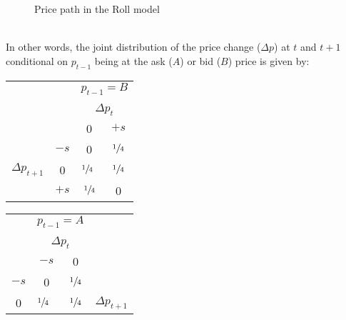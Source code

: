 \documentclass[12pt,twoside]{article}
\begin{document}
\begin{solution}
\begin{figure}[!htbp]
        \caption{Price path in the Roll model}
        \label{fig:roll_model}
    \end{figure}
    \\
    In other words, the joint distribution of the price change (\(\Delta p\)) at \(t\) and \(t+1\) conditional on \(p_{t-1}\) being at the ask (\(A\)) or bid (\(B\)) price is given by:
    \begin{table}[H]
        \centering
        \begingroup
        \color{nu purple}
        \begin{tabular}{cccc}
            & & \multicolumn{2}{c}{\(p_{t-1} = B\)} \\\\
            & & \multicolumn{2}{c}{\(\Delta p_{t}\)} \\
            & & 0 & \(+s\) \\ \cline{3-4} 
            & \multicolumn{1}{c|}{\(-s\)} & \multicolumn{1}{c|}{0}   & \multicolumn{1}{c|}{\(\sfrac{1}{4}\)} \\ \cline{3-4} 
    $\Delta p_{t+1}$ & \multicolumn{1}{c|}{0}  & \multicolumn{1}{l|}{\(\sfrac{1}{4}\)} & \multicolumn{1}{c|}{\(\sfrac{1}{4}\)} \\ \cline{3-4} 
            & \multicolumn{1}{c|}{\(+s\)} & \multicolumn{1}{c|}{\(\sfrac{1}{4}\)} & \multicolumn{1}{c|}{0}   \\ \cline{3-4} 
        \end{tabular}
        \qquad
        \begin{tabular}{cccc}
             & \multicolumn{2}{c}{\(p_{t-1} = A\)} & \\\\
             & \multicolumn{2}{c}{\(\Delta p_{t}\)} & \\
             & \(-s\) & 0 & \\ \cline{2-3} 
             \multicolumn{1}{c|}{\(-s\)} & \multicolumn{1}{c|}{0}   & \multicolumn{1}{c|}{\(\sfrac{1}{4}\)} & \\ \cline{2-3} 
      \multicolumn{1}{c|}{0}  & \multicolumn{1}{l|}{\(\sfrac{1}{4}\)} & \multicolumn{1}{c|}{\(\sfrac{1}{4}\)} & $\Delta p_{t+1}$ \\ \cline{2-3} 

\end{tabular}
\end{table}
\end{solution}
\end{document}

